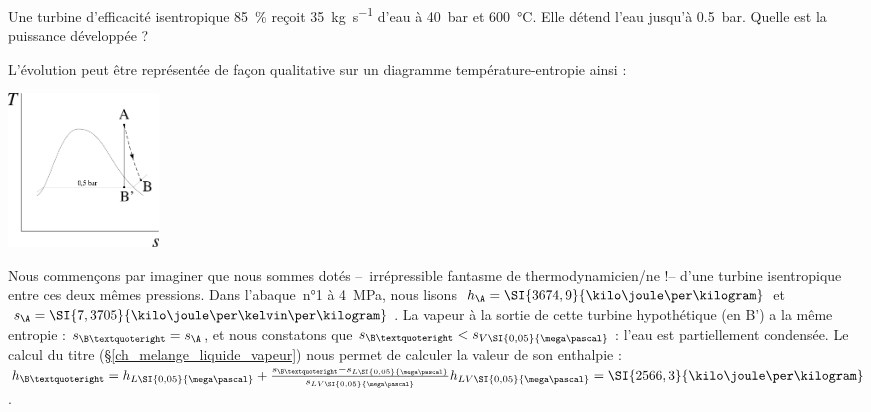 		\begin{anexample}
		\label{exemple_turbine_centrale}
			Une turbine d’efficacité isentropique \SI{85}{\percent} reçoit \SI{35}{\kilogram\per\second} d’eau à \SI{40}{\bar} et \SI{600}{\degreeCelsius}. Elle détend l’eau jusqu’à \SI{0,5}{\bar}. Quelle est la puissance développée ?
				\begin{answer}
					L’évolution peut être représentée de façon qualitative sur un diagramme température-entropie ainsi :
						\begin{center}\includegraphics[width=4cm]{images/exe_ts_turbine.png}\end{center}
					Nous commençons par imaginer que nous sommes dotés --\ irrépressible fantasme de thermodynamicien/ne !-- d’une turbine isentropique entre ces deux mêmes pressions. Dans l’abaque~n°1 à \SI{4}{\mega\pascal}, nous lisons $h_\A = \SI{3674,9}{\kilo\joule\per\kilogram}$ et $s_\A = \SI{7,3705}{\kilo\joule\per\kelvin\per\kilogram}$. La vapeur à la sortie de cette turbine hypothétique (en B’) a la même entropie : $s_{\B’} = s_\A$, et nous constatons que $s_{\B’} < s_{V \SI{0,05}{\mega\pascal}}$ : l’eau est partiellement condensée. Le calcul du titre (\S\ref{ch_melange_liquide_vapeur}) nous permet de calculer la valeur de son enthalpie : $h_{\B’} = h_{L \SI{0,05}{\mega\pascal}} + \frac{s_{\B’} - s_{L \SI{0,05}{\mega\pascal}}}{s_{LV \SI{0,05}{\mega\pascal}}} h_{LV \SI{0,05}{\mega\pascal}} = \SI{2566,3}{\kilo\joule\per\kilogram}$.
					

\end{answer}
\end{anexample}
